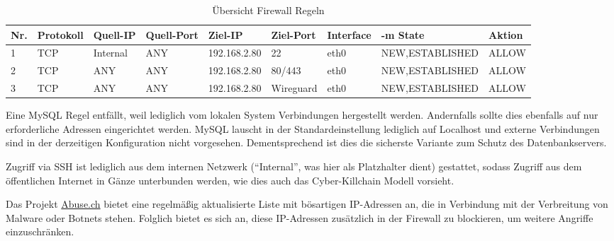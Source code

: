 \begin{table}[!ht]
    \centering
    \begin{adjustbox}{width=\textwidth}

    \begin{tabular}{|l|l|l|l|l|l|l|l|l|}
        \hline
            Nr. & Protokoll & Quell-IP & Quell-Port & Ziel-IP & Ziel-Port & Interface & -m State & Aktion \\ \hline
            1 & TCP & Internal & ANY & 192.168.2.80 & 22 & eth0 & NEW,ESTABLISHED & ALLOW \\ \hline
            2 & TCP & ANY & ANY & 192.168.2.80 & 80/443 & eth0 & NEW,ESTABLISHED & ALLOW \\ \hline
            3 & TCP & ANY & ANY & 192.168.2.80 & Wireguard & eth0 & NEW,ESTABLISHED & ALLOW \\ \hline
        \end{tabular}
    \end{adjustbox}
    \caption{Übersicht Firewall Regeln}
    \label{regeln_fw_incoming}
\end{table}

Eine MySQL Regel entfällt, weil lediglich vom lokalen System Verbindungen hergestellt werden. Andernfalls sollte dies ebenfalls auf nur erforderliche Adressen eingerichtet werden. MySQL lauscht in der Standardeinstellung lediglich auf Localhost und externe Verbindungen sind in der derzeitigen Konfiguration nicht vorgesehen. Dementsprechend ist dies die sicherste Variante zum Schutz des Datenbankservers.

Zugriff via \ac{SSH} ist lediglich aus dem internen Netzwerk (\enquote{Internal}, was hier als Platzhalter dient) gestattet, sodass Zugriff aus dem öffentlichen Internet in Gänze unterbunden werden, wie dies auch das Cyber-Killchain Modell vorsieht.

Das Projekt \href{https://abuse.ch}{Abuse.ch} bietet eine regelmäßig aktualisierte Liste mit bösartigen IP-Adressen an, die in Verbindung mit der Verbreitung von Malware oder Botnets stehen. Folglich bietet es sich an, diese IP-Adressen zusätzlich in der Firewall zu blockieren, um weitere Angriffe einzuschränken.
